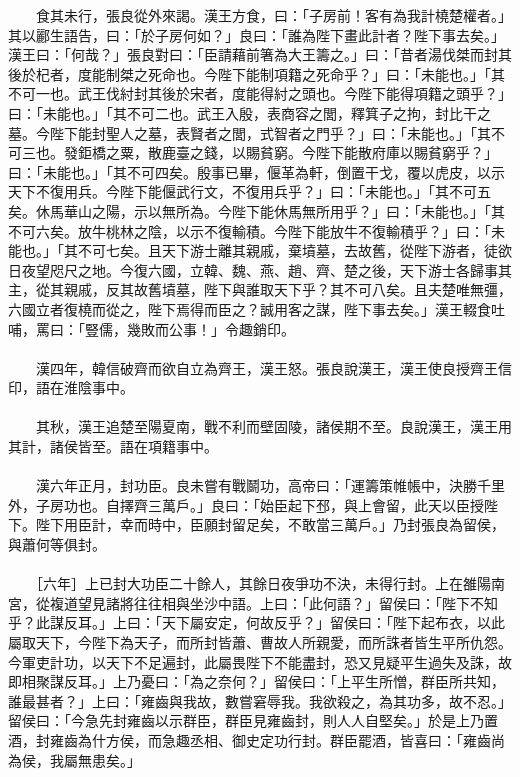 　　食其未行，張良從外來謁。漢王方食，曰：「子房前！客有為我計橈楚權者。」其以酈生語告，曰：「於子房何如？」良曰：「誰為陛下畫此計者？陛下事去矣。」漢王曰：「何哉？」張良對曰：「臣請藉前箸為大王籌之。」曰：「昔者湯伐桀而封其後於杞者，度能制桀之死命也。今陛下能制項籍之死命乎？」曰：「未能也。」「其不可一也。武王伐紂封其後於宋者，度能得紂之頭也。今陛下能得項籍之頭乎？」曰：「未能也。」「其不可二也。武王入殷，表商容之閭，釋箕子之拘，封比干之墓。今陛下能封聖人之墓，表賢者之閭，式智者之門乎？」曰：「未能也。」「其不可三也。發鉅橋之粟，散鹿臺之錢，以賜貧窮。今陛下能散府庫以賜貧窮乎？」曰：「未能也。」「其不可四矣。殷事已畢，偃革為軒，倒置干戈，覆以虎皮，以示天下不復用兵。今陛下能偃武行文，不復用兵乎？」曰：「未能也。」「其不可五矣。休馬華山之陽，示以無所為。今陛下能休馬無所用乎？」曰：「未能也。」「其不可六矣。放牛桃林之陰，以示不復輸積。今陛下能放牛不復輸積乎？」曰：「未能也。」「其不可七矣。且天下游士離其親戚，棄墳墓，去故舊，從陛下游者，徒欲日夜望咫尺之地。今復六國，立韓、魏、燕、趙、齊、楚之後，天下游士各歸事其主，從其親戚，反其故舊墳墓，陛下與誰取天下乎？其不可八矣。且夫楚唯無彊，六國立者復橈而從之，陛下焉得而臣之？誠用客之謀，陛下事去矣。」漢王輟食吐哺，罵曰：「豎儒，幾敗而公事！」令趣銷印。
\\\\
　　漢四年，韓信破齊而欲自立為齊王，漢王怒。張良說漢王，漢王使良授齊王信印，語在淮陰事中。
\\\\
　　其秋，漢王追楚至陽夏南，戰不利而壁固陵，諸侯期不至。良說漢王，漢王用其計，諸侯皆至。語在項籍事中。
\\\\
　　漢六年正月，封功臣。良未嘗有戰鬬功，高帝曰：「運籌策帷帳中，決勝千里外，子房功也。自擇齊三萬戶。」良曰：「始臣起下邳，與上會留，此天以臣授陛下。陛下用臣計，幸而時中，臣願封留足矣，不敢當三萬戶。」乃封張良為留侯，與蕭何等俱封。
\\\\
　　［六年］上已封大功臣二十餘人，其餘日夜爭功不決，未得行封。上在雒陽南宮，從複道望見諸將往往相與坐沙中語。上曰：「此何語？」留侯曰：「陛下不知乎？此謀反耳。」上曰：「天下屬安定，何故反乎？」留侯曰：「陛下起布衣，以此屬取天下，今陛下為天子，而所封皆蕭、曹故人所親愛，而所誅者皆生平所仇怨。今軍吏計功，以天下不足遍封，此屬畏陛下不能盡封，恐又見疑平生過失及誅，故即相聚謀反耳。」上乃憂曰：「為之奈何？」留侯曰：「上平生所憎，群臣所共知，誰最甚者？」上曰：「雍齒與我故，數嘗窘辱我。我欲殺之，為其功多，故不忍。」留侯曰：「今急先封雍齒以示群臣，群臣見雍齒封，則人人自堅矣。」於是上乃置酒，封雍齒為什方侯，而急趣丞相、御史定功行封。群臣罷酒，皆喜曰：「雍齒尚為侯，我屬無患矣。」
